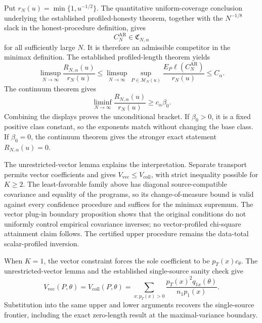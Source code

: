 Put \(r_N(u)=\min\{1,u^{-1/2}\}\). The quantitative uniform-coverage conclusion underlying the established profiled-honesty theorem, together with the \(N^{-1/8}\) slack in the honest-procedure definition, gives
\[
C_N^{\mathrm{AR}}\in\mathfrak C_{N,\alpha}
\]
for all sufficiently large \(N\). It is therefore an admissible competitor in the minimax definition. The established profiled-length theorem yields
\[
\limsup_{N\to\infty}\frac{R_{N,\alpha}(u)}{r_N(u)}
\le
\limsup_{N\to\infty}\sup_{P\in\mathcal M_N(u)}
\frac{E_P\ell(C_N^{\mathrm{AR}})}{r_N(u)}
\le C_\alpha.
\]
The continuum theorem gives
\[
\liminf_{N\to\infty}\frac{R_{N,\alpha}(u)}{r_N(u)}
\ge c_\alpha\beta_0.
\]
Combining the displays proves the unconditional bracket. If \(\beta_0>0\), it is a fixed positive class constant, so the exponents match without changing the base class. If \(\beta_0=0\), the continuum theorem gives the stronger exact statement \(R_{N,\alpha}(u)=0\).

The unrestricted-vector lemma explains the interpretation. Separate transport permits vector coefficients and gives \(V_{\mathrm{vec}}\le V_{\mathrm{coll}}\), with strict inequality possible for \(K\ge2\). The least-favorable family above has diagonal source-compatible covariance and equality of the programs, so its change-of-measure bound is valid against every confidence procedure and suffices for the minimax supremum. The vector plug-in boundary proposition shows that the original conditions do not uniformly control empirical covariance inverses; no vector-profiled chi-square attainment claim follows. The certified upper procedure remains the data-total scalar-profiled inversion.

When \(K=1\), the vector constraint forces the sole coefficient to be \(p_T(x)c_\theta\). The unrestricted-vector lemma and the established single-source sanity check give
\[
V_{\mathrm{vec}}(P,\theta)=V_{\mathrm{coll}}(P,\theta)
=\sum_{x:p_T(x)>0}
\frac{p_T(x)^2q_{1x}(\theta)}{n_1p_1(x)}.
\]
Substitution into the same upper and lower arguments recovers the single-source frontier, including the exact zero-length result at the maximal-variance boundary.
